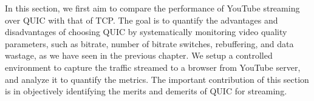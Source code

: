 

In this section, we first aim to compare the performance of YouTube streaming over QUIC with that of TCP. 
The goal is to quantify the advantages and disadvantages of choosing QUIC by systematically monitoring video quality parameters, such as bitrate, number of bitrate switches, rebuffering, and data wastage, as we have seen in the previous chapter. We setup a controlled environment to capture the traffic streamed to a browser from YouTube server, and analyze it to quantify the metrics. The important contribution of this section is in objectively identifying the merits and demerits of QUIC for streaming. 


